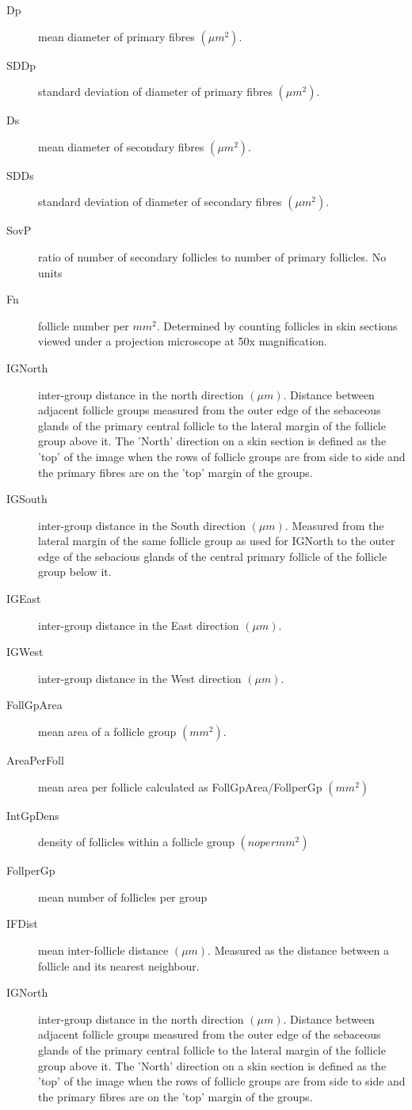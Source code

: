 \documentclass[titlepage]{article}  %
\begin{document}
\begin{description}
\item[Dp]  mean diameter of primary fibres $(\mu m^2)$.
\item[SDDp] standard deviation of diameter of primary fibres $(\mu m^2)$.
\item[Ds] mean diameter of secondary fibres $(\mu m^2)$.
\item[SDDs] standard deviation of diameter of secondary fibres $(\mu m^2)$.
\item[SovP] ratio of number of secondary follicles to number of primary follicles. No units
\item[Fn] follicle number per $mm^2$. Determined by counting follicles in skin sections viewed under a projection microscope at 50x magnification.
\item[IGNorth]  inter-group distance in the north direction $(\mu m)$. Distance between adjacent follicle groups measured from the outer edge of the sebaceous glands of the primary central follicle to the lateral margin of the follicle group above it. The 'North' direction on a skin section is defined as the 'top' of the image when the rows of follicle groups are from side to side and the primary fibres are on the 'top' margin of the groups.
\item[IGSouth] inter-group distance in the South direction $(\mu m)$. Measured from the lateral margin of the same follicle group as used for IGNorth to the outer edge of the sebacious glands of the central primary follicle of the follicle group below it.
\item[IGEast] inter-group distance in the East direction $(\mu m)$.
\item[IGWest] inter-group distance in the West direction $(\mu m)$.
\item[FollGpArea] mean area of a follicle group $(mm^2)$.
\item[AreaPerFoll] mean area per follicle calculated as FollGpArea/FollperGp $(mm^2)$
\item[IntGpDens] density of follicles within a follicle group $(no per mm^2)$
\item[FollperGp] mean number of follicles per group
\item[IFDist] mean inter-follicle distance $(\mu m)$. Measured as the distance between a follicle and its nearest neighbour.
\item[IGNorth]  inter-group distance in the north direction $(\mu m)$. Distance between adjacent follicle groups measured from the outer edge of the sebaceous glands of the primary central follicle to the lateral margin of the follicle group above it. The 'North' direction on a skin section is defined as the 'top' of the image when the rows of follicle groups are from side to side and the primary fibres are on the 'top' margin of the groups.

\end{description}
\end{document}

